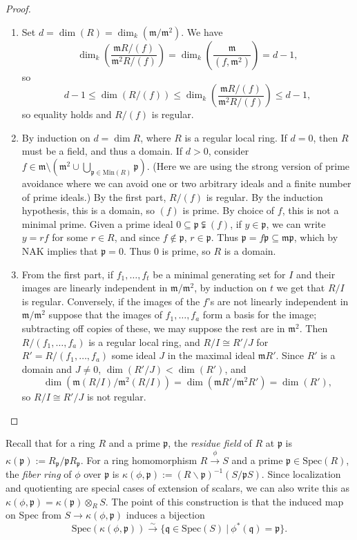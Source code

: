 \documentclass{amsart}[12pt]
\newcommand{\Spec}{\mathrm{Spec}}
\newcommand{\fp}{{\mathfrak p}}
\newcommand{\fm}{{\mathfrak m}}
\newcommand{\fq}{{\mathfrak q}}
\numberwithin{equation}{section}
\theoremstyle{plain} %
\theoremstyle{definition}
\theoremstyle{remark}
\newcommand{\xra}[1]{\xrightarrow{#1}}
\begin{document}
\begin{proof}
\begin{enumerate}
\item Set $d=\dim(R) = \dim_k(\fm/\fm^2)$. We have \[\dim_k(\frac{\fm R/(f)}{\fm^2 R/(f)}) =\dim_k( \frac{\fm}{(f,\fm^2)}) =d-1,\] so \[d-1 \leq \dim(R/(f)) \leq \dim_k(\frac{\fm R/(f)}{\fm^2 R/(f)}) \leq d-1,\] so equality holds and $R/(f)$ is regular.
\item By induction on $d = \dim R$, where $R$ is a regular local ring. If $d=0$, then $R$ must be a field, and thus a domain.
If $d>0$, consider $f \in \fm \setminus \left( \fm^2 \cup \bigcup_{\mathfrak{p} \in \mathrm{Min}(R)} \mathfrak{p} \right)$. (Here we are using the strong version of prime avoidance where we can avoid one or two arbitrary ideals and a finite number of prime ideals.) By the first part, $R/(f)$ is regular. By the induction hypothesis, this is a domain, so $(f)$ is prime. By choice of $f$, this is not a minimal prime. Given a prime ideal $0 \subseteq \mathfrak{p} \subsetneqq (f)$, if $y \in \mathfrak{p}$, we can write $y =rf$ for some $r \in R$, and since $f\notin \fp$,  $r \in \mathfrak{p}$. Thus $\mathfrak{p} = f \fp \subseteq \fm \fp$, which by NAK implies that $\mathfrak{p} = 0$. Thus  $0$ is prime, so $R$ is a domain.
\item From the first part, if $f_1,\dots,f_t$ be a minimal generating set for $I$ and their images are linearly independent in $\fm/\fm^2$, by induction on $t$ we get that $R/I$ is regular. Conversely, if the images of the $f$'s are not linearly independent in $\fm/\fm^2$ suppose that the images of $f_1,\dots,f_a$ form a basis for the image; subtracting off copies of these, we may suppose the rest are in $\fm^2$. Then $R/(f_1,\dots,f_a)$ is a regular local ring, and $R/I \cong R'/J$ for $R'=R/(f_1,\dots,f_a)$ some ideal $J$ in the maximal ideal $\fm R'$. Since $R'$ is a domain and $J\neq 0$, $\dim(R'/J)<\dim(R')$, and \[\dim(\fm (R/I)/ \fm^2 (R/I)) = \dim (\fm R' / \fm^2 R') = \dim(R'),\] so $R/I\cong R'/J$ is not regular.\qedhere
\end{enumerate}
\end{proof}



Recall that for a ring  $R$ and a prime $\fp$, the \emph{residue field} of $R$ at $\fp$ is $\kappa(\fp):=R_{\fp}/\fp R_{\fp}$\index{$\kappa(\fp)$}. For a ring homomorphism $R\xra{\phi} S$ and a prime $\fp\in \Spec(R)$, the \emph{fiber ring} of $\phi$ over $\fp$ is $\kappa(\phi,\fp):=(R\smallsetminus \fp)^{-1}(S/\fp S)$\index{$\kappa(\phi,\fp)$}. Since localization and quotienting are special cases of extension of scalars, we can also write this as $\kappa(\phi,\fp) = \kappa(\fp) \otimes_R S$. The point of this construction is that the induced map on Spec from $S \to \kappa(\phi,\fp)$ induces a bijection
\[  \Spec(\kappa(\phi,\fp)) \xra{\sim} \{ \fq \in \Spec(S) \ | \ \phi^*(\fq) = \fp \} .\]
\end{document}

